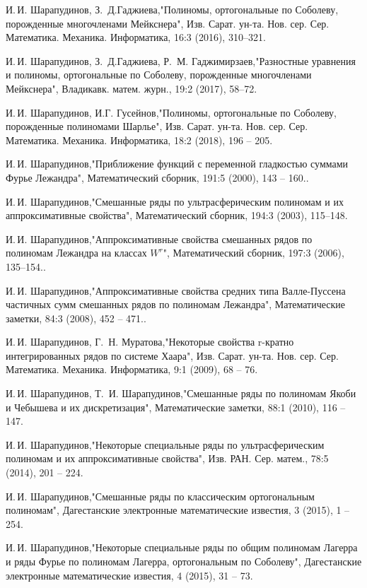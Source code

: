 \begin{thebibliography}{20}
И.\,И. Шарапудинов, З.\, Д.Гаджиева,"Полиномы, ортогональные по Соболеву, порожденные многочленами Мейкснера", Изв. Сарат. ун-та. Нов. сер. Сер. Математика. Механика. Информатика, 16:3 (2016), 310--321.

И.\,И. Шарапудинов, З.\, Д.Гаджиева, Р.\, М. Гаджимирзаев,"Разностные уравнения и полиномы, ортогональные по Соболеву, порожденные многочленами Мейкснера", Владикавк. матем. журн., 19:2 (2017), 58--72.

И.\,И. Шарапудинов, И.Г. Гусейнов,"Полиномы, ортогональные по Соболеву, порожденные полиномами Шарлье", Изв. Сарат. ун-та. Нов. сер. Сер. Математика. Механика. Информатика, 18:2 (2018), 196 -- 205.

И.\,И. Шарапудинов,"Приближение функций с переменной гладкостью суммами Фурье Лежандра", Математический сборник, 191:5 (2000), 143 -- 160..

И.\,И. Шарапудинов,"Смешанные ряды по ультрасферическим полиномам и их аппроксимативные свойства", Математический сборник, 194:3 (2003), 115--148.

И.\,И. Шарапудинов,"Аппроксимативные свойства смешанных рядов по полиномам Лежандра на классах $W^r$", Математический сборник, 197:3 (2006), 135–154..

И.\,И. Шарапудинов,"Аппроксимативные свойства средних типа Валле-Пуссена частичных сумм смешанных рядов по полиномам Лежандра", Математические заметки, 84:3 (2008), 452 -- 471..

И.\,И. Шарапудинов,  Г.\, Н. Муратова,"Некоторые свойства r-кратно интегрированных рядов по системе Хаара", Изв. Сарат. ун-та. Нов. сер. Сер. Математика. Механика. Информатика, 9:1 (2009), 68 -- 76.

И.\,И. Шарапудинов, Т.\, И. Шарапудинов,"Смешанные ряды по полиномам Якоби и Чебышева и их дискретизация", Математические заметки, 88:1 (2010), 116 -- 147.

И.\,И. Шарапудинов,"Некоторые специальные ряды по ультрасферическим полиномам и их аппроксимативные свойства", Изв. РАН. Сер. матем., 78:5 (2014), 201 -- 224.

И.\,И. Шарапудинов,"Смешанные ряды по классическим ортогональным полиномам", Дагестанские электронные математические известия, 3 (2015), 1 -- 254.

И.\,И. Шарапудинов,"Некоторые специальные ряды по общим полиномам Лагерра и ряды Фурье по полиномам Лагерра, ортогональным по Соболеву", Дагестанские электронные математические известия, 4 (2015), 31 -- 73.


\end{thebibliography}
